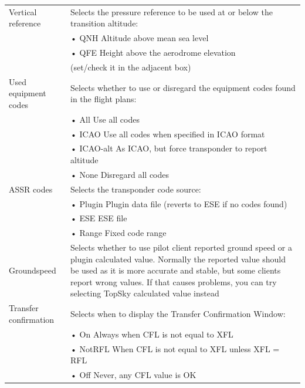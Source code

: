 \documentclass[a4paper,oneside,11pt]{memoir}
\begin{document}
\begin{longtable}{p{5cm} p{7.5cm}}
  Vertical reference      & Selects the pressure reference to be used at or below the transition altitude:\\                          & \hspace{10pt}• QNH Altitude above mean sea level\\                          & \hspace{10pt}• QFE Height above the aerodrome elevation\\                          & (set/check it in the adjacent box)\\
  Used equipment codes    & Selects whether to use or disregard the equipment codes found in the flight plans:\\                          & \hspace{10pt}• All Use all codes\\                          & \hspace{10pt}• ICAO Use all codes when specified in ICAO format\\                          & \hspace{10pt}• ICAO-alt As ICAO, but force transponder to report altitude\\                          & \hspace{10pt}• None Disregard all codes\\
  ASSR codes              & Selects the transponder code source:\\                          & \hspace{10pt}• Plugin Plugin data file (reverts to ESE if no codes found)\\                          & \hspace{10pt}• ESE ESE file\\                          & \hspace{10pt}• Range Fixed code range\\
  Groundspeed             & Selects whether to use pilot client reported ground speed or a plugin calculated value. Normally the reported value should be used as it is more accurate and stable, but some clients report wrong values. If that causes problems, you can try selecting TopSky calculated value instead\\ 
  Transfer confirmation   & Selects when to display the Transfer Confirmation Window:\\                          & \hspace{10pt}• On Always when CFL is not equal to XFL\\                          & \hspace{10pt}• NotRFL When CFL is not equal to XFL unless XFL = RFL\\                          & \hspace{10pt}• Off Never, any CFL value is OK\\

\end{longtable}
\end{document}
